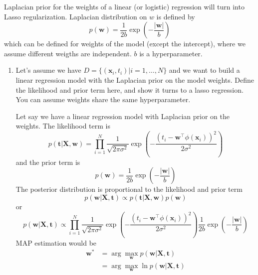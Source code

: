 \documentclass{article}
\begin{document}
Laplacian prior for the weights of a linear (or logistic) regression will turn into 
Lasso regularization. Laplacian distribution on $w$ is defined by 
\begin{equation}
    p(\mathbf{w}) = \frac{1}{2b} \exp\left(-\frac{|\mathbf{w}|}{b}\right)
\end{equation}
which can be defined for weights of the model (except the intercept), where we assume different weigths 
are independent. $b$ is a hyperparameter. 
\begin{enumerate}
    \item Let’s assume we have $D = \{(\mathbf{x}_i,t_i)| i = 1, \dots, N\}$  and  we  want  to  build  a  linear  regression  model 
    with the Laplacian prior on the model weights. Define the likelihood and prior term here, and show it turns 
    to a lasso regression. You can assume weights share the same hyperparameter. 
    \color{blue}
    \begin{sol}
        Let say we have a linear regression model with Laplacian prior on the weights. The likelihood term is
        \begin{equation*}
            p(\mathbf{t}|\mathbf{X},\mathbf{w}) = \prod_{i=1}^N \frac{1}{\sqrt{2\pi\sigma^2}} \exp\left(-\frac{(t_i - \mathbf{w}^\top\phi(\mathbf{x}_i))^2}{2\sigma^2}\right)
        \end{equation*}
        and the prior term is
        \begin{equation*}
            p(\mathbf{w}) = \frac{1}{2b} \exp\left(-\frac{|\mathbf{w}|}{b}\right)
        \end{equation*}
        The posterior distribution is proportional to the likelihood and prior term
        \begin{equation*}
            p(\mathbf{w}|\mathbf{X},\mathbf{t}) \propto p(\mathbf{t}|\mathbf{X},\mathbf{w})p(\mathbf{w})
        \end{equation*}
        or
        \begin{equation*}
            p(\mathbf{w}|\mathbf{X},\mathbf{t}) \propto \prod_{i=1}^N \frac{1}{\sqrt{2\pi\sigma^2}} \exp\left(-\frac{(t_i - \mathbf{w}^\top\phi(\mathbf{x}_i))^2}{2\sigma^2}\right) \frac{1}{2b} \exp\left(-\frac{|\mathbf{w}|}{b}\right)
        \end{equation*}
        MAP estimation would be
        \begin{align*}
            \mathbf{w}^* &= \arg\max_{\mathbf{w}} p(\mathbf{w}|\mathbf{X},\mathbf{t})\\
            &= \arg\max_{\mathbf{w}} \ln p(\mathbf{w}|\mathbf{X},\mathbf{t})\\

\end{align*}
\end{sol}
\end{enumerate}
\end{document}
